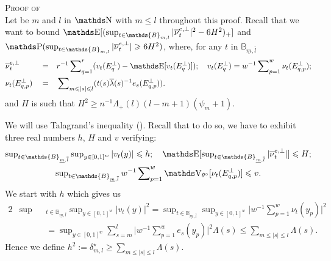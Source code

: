 \begin{pro}{\textsc{Proof of }\\}\label{PRO_FREQ_CIRCDECONV_KNOWN_BETA_ORACLE_NP_TALAGRAND}
Let be $m$ and $l$ in $\N$ with $m \leq l$ throughout this proof.
Recall that we want to bound
$\E[(\sup\nolimits_{t \in \mathds{B}_{m, l}}\vert \overline{\nu}^{e, \perp}_{t} \vert^{2} - 6 H^{2})_{+}]$ and
$\P(\sup\nolimits_{t \in \mathds{B}_{m, l}} \vert \overline{\nu}^{e, \perp}_{t} \vert \geq 6 H^{2})$,
where, for any $t$ in $\mathds{B}_{\underline{m}, \overline{l}}$
\begin{alignat*}{3}
& \overline{\nu}^{e, \perp}_{t} && = && r^{-1} \sum\nolimits_{q = 1}^{r} (v_{t}(E^{\perp}_{q}) - \E[v_{t}(E^{\perp}_{q})]); \quad v_{t}(E^{\perp}_{q}) = w^{-1} \sum\nolimits_{p = 1}^{w} \nu_{t}(E^{\perp}_{q, p});\\
& \nu_{t}(E^{\perp}_{q, p}) && = && \sum\nolimits_{m \leq \vert s \vert \leq l} (t(s)\overline{\lambda}(s)^{-1} e_{s}(E^{\perp}_{q, p})).
\end{alignat*}
and $H$ is such that $H^{2} \geq n^{-1}\Lambda_{+}(l)(l - m + 1) (\psi_{m} + 1)$.

We will use Talagrand's inequality ().
Recall that to do so, we have to exhibit three real numbers $h$, $H$ and $v$ verifying:
\begin{multline*}
	\sup\nolimits_{t \in \mathds{B}_{\underline{m}, \overline{l}}}\sup\nolimits_{y \in [0, 1]^{w}}\vert v_{t}(y)\vert \leq h; \quad \E[\sup\nolimits_{t \in \mathds{B}_{\underline{m}, \overline{l}}}\vert \overline{\nu}_{t}^{e, \perp}\vert ]\leq H;\\ \sup\nolimits_{t \in \mathds{B}_{\underline{m}, \overline{l}}} w^{-1} \sum\nolimits_{p = 1}^{w} \V_{\theta^{\circ}}[\nu_{t}(E_{q,p}^{\perp})]\leq v.
\end{multline*}
We start with $h$ which gives us
\begin{alignat*}{2}
& \sup\nolimits&&_{t \in \mathds{B}_{\underline{m}, \overline{l}}} \sup\nolimits_{y \in [0, 1]^{w}} \vert v_{t}(y) \vert^{2} = \sup\nolimits_{t \in \mathds{B}_{\underline{m}, \overline{l}}} \sup\nolimits_{y \in [0, 1]^{w}} \vert  w^{-1}  \sum\nolimits_{p = 1}^{w} \nu_{t}(y_{p}) \vert^{2}\\
& && = \sup\nolimits_{y \in [0, 1]^{w}} \sum\nolimits_{s = m}^{l} \vert w^{-1}  \sum\nolimits_{p = 1}^{w} e_{s}(y_{p})\vert^{2}\Lambda(s)\leq \sum\nolimits_{m \leq \vert s \vert \leq l} \Lambda(s).
\end{alignat*}
Hence we define $h^{2} := \delta^{\star}_{m, l} \geq \sum\nolimits_{m \leq \vert s \vert \leq l} \Lambda(s)$.


\end{pro}
